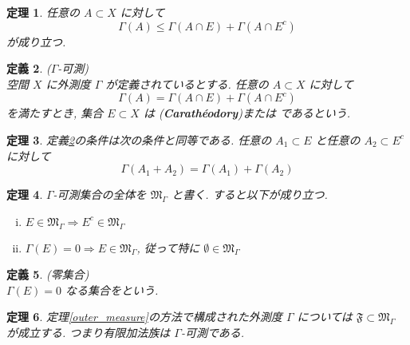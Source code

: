 \documentclass[dvipdfmx]{jsreport}
\newtheorem{theo}{定理}[section]
\newtheorem{defi}[theo]{定義}
\begin{document}
\begin{theo}
    任意の $A \subset X$ に対して
    \begin{equation}
        \Gamma(A) \leq \Gamma(A \cap E) + \Gamma(A \cap E^c)
    \end{equation}
    が成り立つ. 
\end{theo}

\begin{defi} \label{gamma_measurable}
    ($\Gamma$-可測) \\
    空間 $X$ に外測度 $\Gamma$ が定義されているとする. 任意の $A \subset X$ に対して
    \begin{equation}
        \Gamma(A) = \Gamma(A \cap E) + \Gamma(A \cap E^c)
    \end{equation}
    を満たすとき, 集合 $E \subset X$ は ({\bf Carathéodory})または であるという. 
\end{defi}
\begin{theo}
    定義\ref{gamma_measurable}の条件は次の条件と同等である. 任意の $A_1 \subset E$ と任意の $A_2 \subset E^c$ に対して
    \begin{equation}
        \Gamma(A_1 + A_2) = \Gamma(A_1) + \Gamma(A_2)
    \end{equation}
\end{theo}

\begin{theo}
    $\Gamma$-可測集合の全体を $\mathfrak{M}_\Gamma$ と書く. すると以下が成り立つ. 
    \begin{enumerate}[(i)]
        \item $E \in \mathfrak{M}_\Gamma \Rightarrow E^c \in \mathfrak{M}_\Gamma$
        \item $\Gamma(E) = 0 \Rightarrow E \in \mathfrak{M}_\Gamma$, 従って特に $\emptyset \in \mathfrak{M}_\Gamma$
    \end{enumerate}
\end{theo}

\begin{defi}
    (零集合) \\
    $\Gamma(E) = 0$ なる集合をという. 
\end{defi}

\begin{theo}
    定理\ref{outer_measure}の方法で構成された外測度 $\Gamma$ については $\mathfrak{F} \subset \mathfrak{M}_\Gamma$ が成立する. つまり有限加法族は $\Gamma$-可測である. 
\end{theo}
\end{document}
